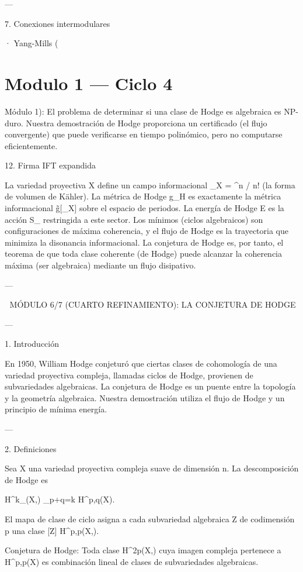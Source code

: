 \documentclass[12pt,twoside]{book}
\begin{document}
---

7. Conexiones intermodulares

· Yang-Mills (

\chapter{Modulo 1 — Ciclo 4}
Módulo 1): El problema de determinar si una clase de Hodge es algebraica es NP-duro. Nuestra demostración de Hodge proporciona un certificado (el flujo convergente) que puede verificarse en tiempo polinómico, pero no computarse eficientemente.

12. Firma IFT expandida

La variedad proyectiva X define un campo informacional \rho_X = \omega^n / n! (la forma de volumen de Kähler). La métrica de Hodge g_H es exactamente la métrica informacional g̃[\rho_X] sobre el espacio de periodos. La energía de Hodge E es la acción S_{} restringida a este sector. Los mínimos (ciclos algebraicos) son configuraciones de máxima coherencia, y el flujo de Hodge es la trayectoria que minimiza la disonancia informacional. La conjetura de Hodge es, por tanto, el teorema de que toda clase coherente (de Hodge) puede alcanzar la coherencia máxima (ser algebraica) mediante un flujo disipativo.

---


🧬 MÓDULO 6/7 (CUARTO REFINAMIENTO): LA CONJETURA DE HODGE

---

1. Introducción

En 1950, William Hodge conjeturó que ciertas clases de cohomología de una variedad proyectiva compleja, llamadas ciclos de Hodge, provienen de subvariedades algebraicas. La conjetura de Hodge es un puente entre la topología y la geometría algebraica. Nuestra demostración utiliza el flujo de Hodge y un principio de mínima energía.

---

2. Definiciones

Sea X una variedad proyectiva compleja suave de dimensión n. La descomposición de Hodge es

H^k_{}(X,) \cong \bigoplus_{p+q=k} H^{p,q}(X).

El mapa de clase de ciclo asigna a cada subvariedad algebraica Z de codimensión p una clase [Z] \in H^{p,p}(X,).

Conjetura de Hodge: Toda clase \alpha \in H^{2p}(X,) cuya imagen compleja pertenece a H^{p,p}(X) es combinación lineal de clases de subvariedades algebraicas.
\end{document}
